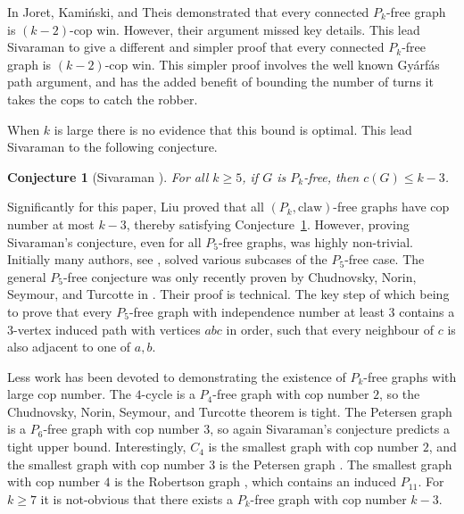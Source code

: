 \documentclass[12pt]{article}
\newtheorem{conjecture}[theorem]{Conjecture}
\theoremstyle{definition}
\def\claw{\text{claw}}
\begin{document}
In \cite{joret2010cops} Joret, Kami{\'n}ski, and Theis demonstrated that 
every connected $P_k$-free graph is $(k-2)$-cop win.
However, their argument missed key details.
This lead Sivaraman \cite{sivaraman2019application} to give a different and simpler proof that every connected $P_k$-free graph is $(k-2)$-cop win.
This simpler proof involves the well known Gy\'arf\'as path argument,
and has the added benefit of bounding the number of turns it takes the cops to catch the robber.

When $k$ is large there is no evidence that this bound is optimal.
This lead Sivaraman to the following conjecture.

\begin{conjecture}[Sivaraman \cite{sivaraman2019application}]\label{Conj: main}
    For all $k\geq 5$, if $G$ is $P_k$-free, then $c(G) \leq k - 3$.
\end{conjecture}

Significantly for this paper, Liu \cite{liu2019cop} proved that all $(P_k,\claw)$-free graphs have cop number at most $k-3$, thereby satisfying Conjecture~\ref{Conj: main}.
However, proving Sivaraman's conjecture,
even for all $P_5$-free graphs,
was highly non-trivial.
Initially many authors, see \cite{gupta2023cops,liu2019cop,sivaraman2019cop,turcotte2022cops}, solved various subcases of the $P_5$-free case.
The general $P_5$-free conjecture was only recently proven
by
Chudnovsky, Norin, Seymour, and Turcotte in \cite{chudnovsky2024cops}.
Their proof is technical. The key step of which being to prove that every $P_5$-free graph with independence number at least $3$ contains a $3$-vertex induced path with vertices $abc$ in order, such that
every neighbour of $c$ is also adjacent to one of $a, b$.


Less work has been devoted to demonstrating the existence of $P_k$-free graphs with large cop number.
The $4$-cycle is a $P_4$-free graph with cop number $2$, so the Chudnovsky, Norin, Seymour, and Turcotte theorem
is tight.
The Petersen graph is a $P_6$-free graph with cop number $3$, so again Sivaraman's conjecture predicts a tight upper bound.
Interestingly, $C_4$ is the smallest graph with cop number $2$, and the smallest graph with cop number $3$ is the Petersen graph \cite{baird2014}.
The smallest graph with cop number $4$ is the Robertson graph \cite{turcotte2021}, which contains an induced $P_{11}$.
For $k\geq 7$ it is not-obvious that there exists a $P_k$-free graph with cop number $k-3$.
\end{document}
